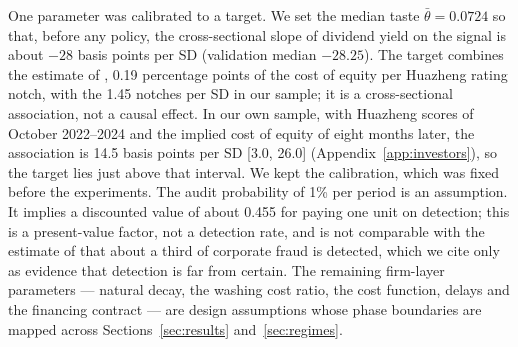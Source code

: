 \documentclass[11pt]{article}
\begin{document}
One parameter was calibrated to a target. We set the median taste $\bar\theta = 0.0724$ so that, before any policy, the cross-sectional slope of dividend yield on the signal is about $-28$ basis points per SD (validation median $-28.25$). The target combines the estimate of \citet{zhao2024esg}, 0.19 percentage points of the cost of equity per Huazheng rating notch, with the 1.45 notches per SD in our sample; it is a cross-sectional association, not a causal effect. In our own sample, with Huazheng scores of October 2022--2024 and the implied cost of equity of \citet{easton2004pe} eight months later, the association is 14.5 basis points per SD [3.0, 26.0] (Appendix~\ref{app:investors}), so the target lies just above that interval. We kept the calibration, which was fixed before the experiments. The audit probability of 1\% per period is an assumption. It implies a discounted value of about 0.455 for paying one unit on detection; this is a present-value factor, not a detection rate, and is not comparable with the estimate of \citet{dyck2024pervasive} that about a third of corporate fraud is detected, which we cite only as evidence that detection is far from certain. The remaining firm-layer parameters --- natural decay, the washing cost ratio, the cost function, delays and the financing contract --- are design assumptions whose phase boundaries are mapped across Sections~\ref{sec:results} and~\ref{sec:regimes}.
\end{document}
